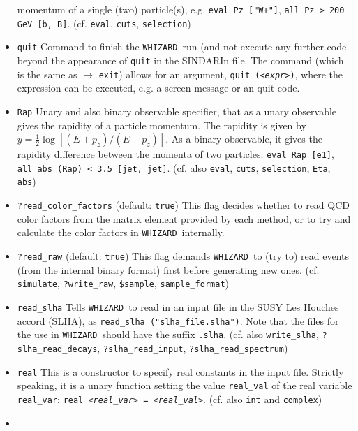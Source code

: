 \documentclass[12pt]{book}
\newcommand{\ttt}[1]{\texttt{#1}}
\newcommand{\whizard}{\texttt{WHIZARD}}
\begin{document}
\begin{itemize}
momentum of a single (two) particle(s), e.g. \ttt{eval Pz ["W+"]},
\ttt{all Pz > 200 GeV [b, B]}. (cf. \ttt{eval}, \ttt{cuts},
\ttt{selection})
\item
\ttt{quit} \newline
Command to finish the \whizard\ run (and not execute any further code
beyond the appearance of \ttt{quit} in the SINDARIn file. The command
(which is the same as $\to$ \ttt{exit}) allows for an argument,
\ttt{quit ({\em <expr>})}, where the expression can be executed, e.g. a
screen message or an quit code.
\item
\ttt{Rap} \newline
Unary and also binary observable specifier, that as a unary observable
gives the rapidity of a particle momentum. The rapidity is given by $y
= \frac12 \log \left[ (E + p_z)/(E-p_z) \right]$. As a binary
observable, it gives the rapidity difference between the momenta of
two particles: \ttt{eval Rap [e1]},  \ttt{all abs (Rap) < 3.5 [jet,
  jet]}. (cf. also \ttt{eval}, \ttt{cuts}, \ttt{selection}, \ttt{Eta},
\ttt{abs})  
\item
\ttt{?read\_color\_factors} \qquad (default: \ttt{true}) \newline
This flag decides whether to read QCD color factors from the matrix
element provided by each method, or to try and calculate the color
factors in \whizard\ internally.
\item
\ttt{?read\_raw} \qquad (default: \ttt{true}) \newline
This flag demands \whizard\ to (try to) read events (from the internal
binary format) first before generating new ones. (cf. \ttt{simulate},
\ttt{?write\_raw}, \ttt{\$sample}, \ttt{sample\_format})
\item
\ttt{read\_slha} \newline
Tells \whizard\ to read in an input file in the SUSY Les Houches accord
(SLHA), as \ttt{read\_slha ("slha\_file.slha")}. Note that the files
for the use in \whizard\ should have the suffix \ttt{.slha}.
(cf. also \ttt{write\_slha}, \ttt{?slha\_read\_decays},
\ttt{?slha\_read\_input}, \ttt{?slha\_read\_spectrum})
\item
\ttt{real} \newline
This is a constructor to specify real constants in the input
file. Strictly speaking, it is a unary function setting the value
\ttt{real\_val} of the real variable \ttt{real\_var}: 
\ttt{real {\em <real\_var>} = {\em <real\_val>}}. (cf. also \ttt{int} and
\ttt{complex}) 
\item

\end{itemize}
\end{document}
